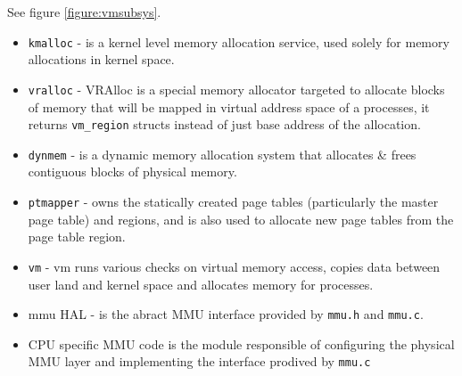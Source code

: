 See figure \ref{figure:vmsubsys}.

\begin{itemize}
  \item \verb+kmalloc+  - is a kernel level memory allocation service, used
                        solely for memory allocations in kernel space.
  \item \verb+vralloc+  - VRAlloc is a special memory allocator targeted to
                        allocate blocks of memory that will be mapped in virtual
                        address space of a processes, it returns
                        \verb+vm_region+ structs instead of just base address of
                        the allocation.
  \item \verb+dynmem+   - is a dynamic memory allocation system that allocates
                        \& frees contiguous blocks of physical memory.
  \item \verb+ptmapper+ - owns the statically created page tables (particularly
                        the master page table) and regions, and is also used to
                        allocate new page tables from the page table region.
  \item \verb+vm+       - vm runs various checks on virtual memory access,
                        copies data between user land and kernel space and
                        allocates memory for processes.
  \item mmu HAL -       is the abract MMU interface provided by \verb+mmu.h+
                        and \verb+mmu.c+.
  \item CPU specific MMU code is the module responsible of configuring the
        physical MMU layer and implementing the interface prodived by
        \verb+mmu.c+
\end{itemize}

